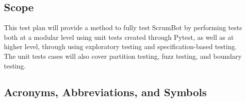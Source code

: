 \documentclass[12pt, titlepage]{article}
\begin{document}
\subsection{Scope}
This test plan will provide a method to fully test ScrumBot by performing tests both at a modular level using unit tests created through Pytest, as well as at higher level, through using exploratory testing and specification-based testing. The unit tests cases will also cover partition testing, fuzz testing, and boundary testing.

\subsection{Acronyms, Abbreviations, and Symbols}
    
\end{document}
